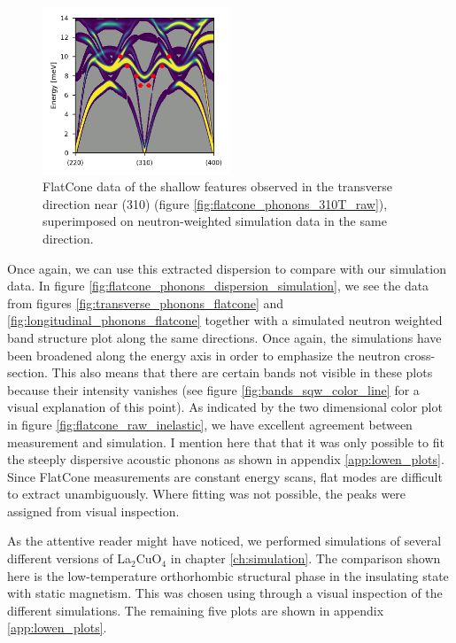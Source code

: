 \begin{figure}
    \centering
    \includegraphics[width=0.5\textwidth]{fig/lowen/flatcone_fits_simulation_310T.png}
    \caption{FlatCone data of the shallow features observed in the transverse direction near (310) (figure \ref{fig:flatcone_phonons_310T_raw}), superimposed on neutron-weighted simulation data in the same direction.}
    \label{fig:flatcone_phonons_310T_sim}
\end{figure}

Once again, we can use this extracted dispersion to compare with our simulation data. In figure \ref{fig:flatcone_phonons_dispersion_simulation}, we see the data from figures \ref{fig:transverse_phonons_flatcone} and \ref{fig:longitudinal_phonons_flatcone}  together with a simulated neutron weighted band structure plot along the same directions. Once again, the simulations have been broadened along the energy axis in order to emphasize the neutron cross-section. This also means that there are certain bands not visible in these plots because their intensity vanishes (see figure \ref{fig:bands_sqw_color_line} for a visual explanation of this point). As indicated by the two dimensional color plot in figure \ref{fig:flatcone_raw_inelastic}, we have excellent agreement between measurement and simulation. I mention here that that it was only possible to fit the steeply dispersive acoustic phonons as shown in appendix \ref{app:lowen_plots}. Since FlatCone measurements are constant energy scans, flat modes are difficult to extract unambiguously. Where fitting was not possible, the peaks were assigned from visual inspection.

As the attentive reader might have noticed, we performed simulations of several different versions of La$_2$CuO$_4$ in chapter \ref{ch:simulation}. The comparison shown here is the low-temperature orthorhombic structural phase in the insulating state with static magnetism. This was chosen using through a visual inspection of the different simulations. The remaining five plots are shown in appendix \ref{app:lowen_plots}.

